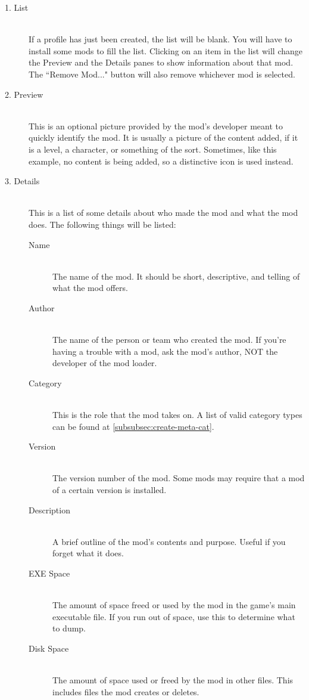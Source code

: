 \documentclass[12pt,a4paper,notitlepage]{article}
\begin{document}
\begin{description}
\item[1. List] \hfill \\
If a profile has just been created, the list will be blank. You will have to install some mods to fill the list. Clicking on an item in the list will change the Preview and the Details panes to show information about that mod. The ``Remove Mod..." button will also remove whichever mod is selected.

\item[2. Preview] \hfill \\
This is an optional picture provided by the mod's developer meant to quickly identify the mod. It is usually a picture of the content added, if it is a level, a character, or something of the sort. Sometimes, like this example, no content is being added, so a distinctive icon is used instead.

\item[3. Details] \hfill \\
This is a list of some details about who made the mod and what the mod does. The following things will be listed:

\begin{description}
\item[Name] \hfill \\ 
    The name of the mod. It should be short, descriptive, and telling of what the mod offers. 
\item[Author] \hfill \\
    The name of the person or team who created the mod. If you're having a trouble with a mod, ask the mod's author, NOT the developer of the mod loader.
\item[Category] \hfill \\
    This is the role that the mod takes on. A list of valid category types can be found at \ref{subsubsec:create-meta-cat}.
\item[Version] \hfill \\
    The version number of the mod. Some mods may require that a mod of a certain version is installed.
\item[Description] \hfill \\
    A brief outline of the mod's contents and purpose. Useful if you forget what it does.
\item[EXE Space] \hfill \\
    The amount of space freed or used by the mod in the game's main executable file. If you run out of space, use this to determine what to dump.
\item[Disk Space] \hfill \\
    The amount of space used or freed by the mod in other files. This includes files the mod creates or deletes.
\end{description}
\end{description}
\end{document}
